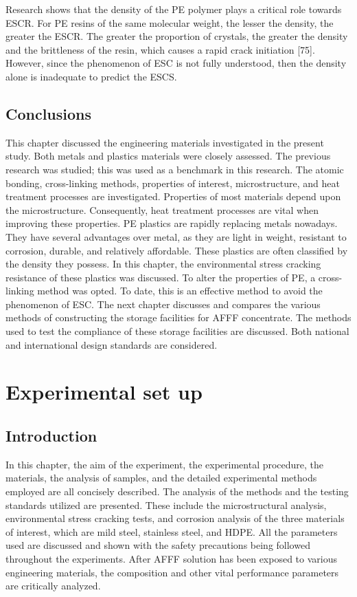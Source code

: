 \documentclass[12pt]{report}
\begin{document}

Research shows that the density of the PE polymer plays a critical role towards ESCR. For PE resins of the same molecular weight, the lesser the density, the greater the ESCR. The greater the proportion of crystals, the greater the density and the brittleness of the resin, which causes a rapid crack initiation [75]. However, since the phenomenon of ESC is not fully understood, then the density alone is inadequate to predict the ESCS. 

\section{Conclusions}
This chapter discussed the engineering materials investigated in the present study. Both metals and plastics materials were closely assessed. The previous research was studied; this was used as a benchmark in this research. The atomic bonding, cross-linking methods, properties of interest, microstructure, and heat treatment processes are investigated. Properties of most materials depend upon the microstructure. Consequently, heat treatment processes are vital when improving these properties.
PE plastics are rapidly replacing metals nowadays. They have several advantages over metal, as they are light in weight, resistant to corrosion, durable, and relatively affordable. These plastics are often classified by the density they possess. In this chapter, the environmental stress cracking resistance of these plastics was discussed. To alter the properties of PE, a cross-linking method was opted. To date, this is an effective method to avoid the phenomenon of ESC.
The next chapter discusses and compares the various methods of constructing the storage facilities for AFFF concentrate. The methods used to test the compliance of these storage facilities are discussed. Both national and international design standards are considered.

\chapter{Experimental set up}
\section{Introduction}
In this chapter, the aim of the experiment, the experimental procedure, the materials, the analysis of samples, and the detailed experimental methods employed are all concisely described. The analysis of the methods and the testing standards utilized are presented. These include the microstructural analysis, environmental stress cracking tests, and corrosion analysis of the three materials of interest, which are mild steel, stainless steel, and HDPE. All the parameters used are discussed and shown with the safety precautions being followed throughout the experiments. After AFFF solution has been exposed to various engineering materials, the composition and other vital performance parameters are critically analyzed.
\end{document}
